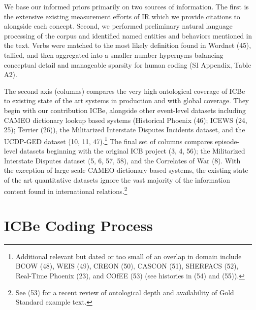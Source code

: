 \documentclass{article}
\begin{document}
We base our informed priors primarily on two sources of information. The
first is the extensive existing measurement efforts of IR which we
provide citations to alongside each concept. Second, we performed
preliminary natural language processing of the corpus and identified
named entities and behaviors mentioned in the text. Verbs were matched
to the most likely definition found in Wordnet (45), tallied, and then
aggregated into a smaller number hypernyms balancing conceptual detail
and manageable sparsity for human coding (SI Appendix, Table A2).

The second axis (columns) compares the very high ontological coverage of
ICBe to existing state of the art systems in production and with global
coverage. They begin with our contribution ICBe, alongside other
event-level datasets including CAMEO dictionary lookup based systems
(Historical Phoenix (46); ICEWS (24, 25); Terrier (26)), the Militarized
Interstate Disputes Incidents dataset, and the UCDP-GED dataset (10, 11,
47).\footnote{Additional relevant but dated or too small of an overlap
  in domain include BCOW (48), WEIS (49), CREON (50), CASCON (51),
  SHERFACS (52), Real-Time Phoenix (23), and COfEE (53) (see histories
  in (54) and (55)).} The final set of columns compares episode-level
datasets beginning with the original ICB project (3, 4, 56); the
Militarized Interstate Disputes dataset (5, 6, 57, 58), and the
Correlates of War (8). With the exception of large scale CAMEO
dictionary based systems, the existing state of the art quantitative
datasets ignore the vast majority of the information content found in
international relations.\footnote{See (53) for a recent review of
  ontological depth and availability of Gold Standard example text.}

\hypertarget{icbe-coding-process}{%
\section*{ICBe Coding Process}\label{icbe-coding-process}}
\end{document}
